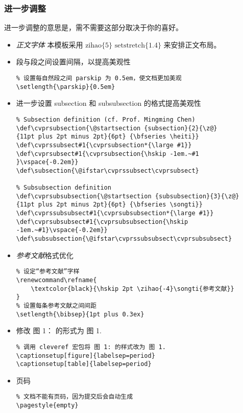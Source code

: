 \documentclass[a4paper]{article}
\begin{document}
{\subsubsection{进一步调整}
进一步调整的意思是，需不需要这部分取决于你的喜好。
\begin{itemize}
    \item \emph{正文字体} 本模板采用 $\text{zihao}\{5\}$ $\text{setstretch}\{1.4\}$ 来安排正文布局。
    \item 段与段之间设置间隔，以提高美观性 \begin{verbatim}
% 设置每自然段之间 parskip 为 0.5em，使文档更加美观
\setlength{\parskip}{0.5em} \end{verbatim}
    \item 进一步设置 subsection 和 subsubsection 的格式提高美观性 \begin{verbatim}
% Subsection definition (cf. Prof. Mingming Chen)
\def\cvprsubsection{\@startsection {subsection}{2}{\z@}
{11pt plus 2pt minus 2pt}{6pt} {\bfseries \heiti}}
\def\cvprssubsect#1{\cvprsubsection*{\large #1}}
\def\cvprsubsect#1{\cvprsubsection{\hskip -1em.~#1 }\vspace{-0.2em}}
\def\subsection{\@ifstar\cvprssubsect\cvprsubsect}

% Subsubsection definition
\def\cvprsubsubsection{\@startsection {subsubsection}{3}{\z@}
{11pt plus 2pt minus 2pt}{6pt} {\bfseries \songti}}
\def\cvprssubsubsect#1{\cvprsubsubsection*{\large #1}}
\def\cvprsubsubsect#1{\cvprsubsubsection{\hskip -1em.~#1}\vspace{-0.2em}}
\def\subsubsection{\@ifstar\cvprssubsubsect\cvprsubsubsect}
\end{verbatim}
    \item \emph{参考文献}格式优化 \begin{verbatim}
% 设定“参考文献”字样
\renewcommand\refname{
    \textcolor{black}{\hskip 2pt \zihao{-4}\songti{参考文献}}
}
% 设置每条参考文献之间间距
\setlength{\bibsep}{1pt plus 0.3ex}
\end{verbatim}
    \item 修改 图 1： 的形式为 图 1. \begin{verbatim}
% 调用 cleveref 宏包将 图 1: 的样式改为 图 1.
\captionsetup[figure]{labelsep=period}
\captionsetup[table]{labelsep=period}
\end{verbatim}
    \item 页码 \begin{verbatim}
% 文档不能有页码，因为提交后会自动生成
\pagestyle{empty}
\end{verbatim}
\end{itemize}


\newpage
\begin{spacing}{1.2}
     \songti
    
    
\end{spacing}
}
\end{document}
